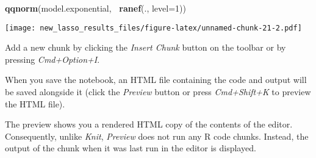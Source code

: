 \documentclass[
]{article}
\newenvironment{Shaded}{\begin{snugshade}}{\end{snugshade}}
\newcommand{\DataTypeTok}[1]{\textcolor[rgb]{0.13,0.29,0.53}{#1}}
\newcommand{\DecValTok}[1]{\textcolor[rgb]{0.00,0.00,0.81}{#1}}
\newcommand{\KeywordTok}[1]{\textcolor[rgb]{0.13,0.29,0.53}{\textbf{#1}}}
\newcommand{\NormalTok}[1]{#1}
\newcommand{\OperatorTok}[1]{\textcolor[rgb]{0.81,0.36,0.00}{\textbf{#1}}}
\begin{document}
\begin{Shaded}
\begin{Highlighting}[]
\KeywordTok{qqnorm}\NormalTok{(model.exponential, }\OperatorTok{~}\KeywordTok{ranef}\NormalTok{(., }\DataTypeTok{level=}\DecValTok{1}\NormalTok{))}
\end{Highlighting}
\end{Shaded}

\texttt{[image: new\_lasso\_results\_files/figure-latex/unnamed-chunk-21-2.pdf]}

Add a new chunk by clicking the \emph{Insert Chunk} button on the
toolbar or by pressing \emph{Cmd+Option+I}.

When you save the notebook, an HTML file containing the code and output
will be saved alongside it (click the \emph{Preview} button or press
\emph{Cmd+Shift+K} to preview the HTML file).

The preview shows you a rendered HTML copy of the contents of the
editor. Consequently, unlike \emph{Knit}, \emph{Preview} does not run
any R code chunks. Instead, the output of the chunk when it was last run
in the editor is displayed.
\end{document}

